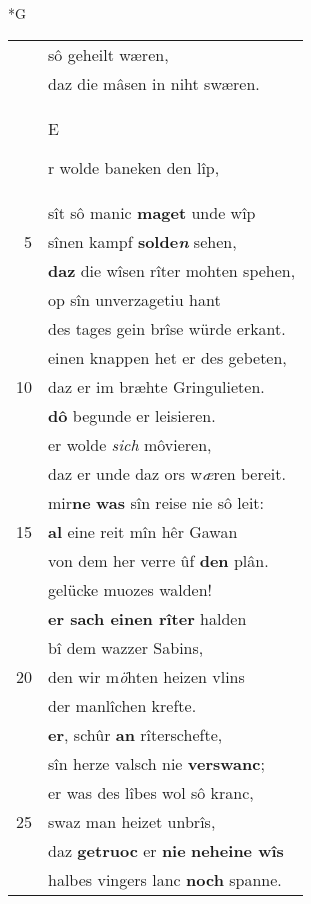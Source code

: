 \documentclass[8pt,a4paper,notitlepage]{article}
\begin{document}
\newpage
\begin{table}[ht]
\begin{minipage}[t]{0.5\linewidth}
\small
\begin{center}*G
\end{center}
\begin{tabular}{rl}
 & sô geheilt wæren,\\ 
 & daz die mâsen in niht swæren.\\ 
 & \begin{large}E\end{large}r wolde baneken den lîp,\\ 
 & sît sô manic \textbf{maget} unde wîp\\ 
5 & sînen kampf \textbf{solde\textit{n}} sehen,\\ 
 & \textbf{daz} die wîsen rîter mohten spehen,\\ 
 & op sîn unverzagetiu hant\\ 
 & des tages gein brîse würde erkant.\\ 
 & einen knappen het er des gebeten,\\ 
10 & daz er im bræhte Gringulieten.\\ 
 & \textbf{dô} begunde er leisieren.\\ 
 & er wolde \textit{sich} môvieren,\\ 
 & daz er unde daz ors w\textit{æ}ren bereit.\\ 
 & mir\textbf{ne} \textbf{was} sîn reise nie sô leit:\\ 
15 & \textbf{al} eine reit mîn hêr Gawan\\ 
 & von dem her verre ûf \textbf{den} plân.\\ 
 & gelücke muozes walden!\\ 
 & \textbf{er sach einen rîter} halden\\ 
 & bî dem wazzer Sabins,\\ 
20 & den wir m\textit{ö}hten heizen vlins\\ 
 & der manlîchen krefte.\\ 
 & \textbf{er}, schûr \textbf{an} rîterschefte,\\ 
 & sîn herze valsch nie \textbf{verswanc};\\ 
 & er was des lîbes wol sô kranc,\\ 
25 & swaz man heizet unbrîs,\\ 
 & daz \textbf{getruoc} er \textbf{nie} \textbf{neheine wîs}\\ 
 & halbes vingers lanc \textbf{noch} spanne.\\ 

\end{tabular}
\end{minipage}
\end{table}
\end{document}
